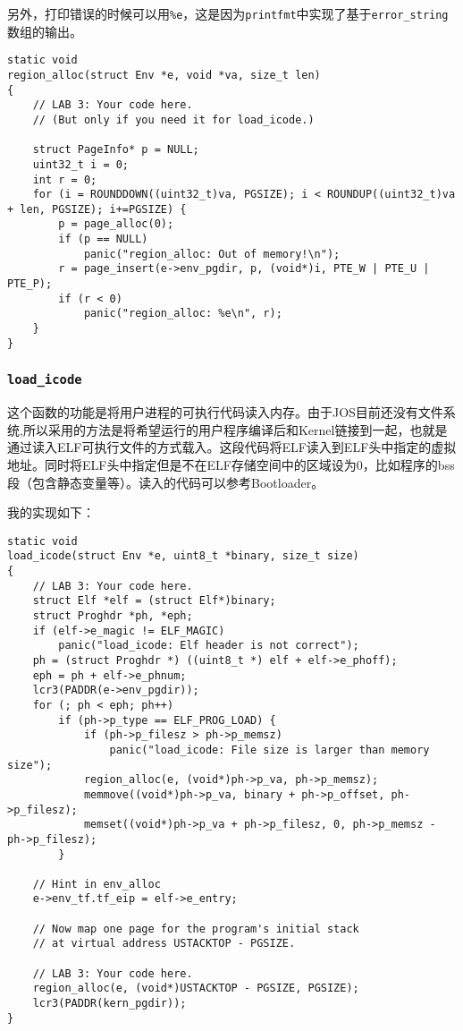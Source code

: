 \documentclass[11pt]{article}
\begin{document}
另外，打印错误的时候可以用\lstinline|%e|，这是因为\lstinline|printfmt|中实现了基于\lstinline|error_string|数组的输出。
\begin{lstlisting}[title=kern/env.c]
static void
region_alloc(struct Env *e, void *va, size_t len)
{
	// LAB 3: Your code here.
	// (But only if you need it for load_icode.)

	struct PageInfo* p = NULL;
	uint32_t i = 0;
	int r = 0;
	for (i = ROUNDDOWN((uint32_t)va, PGSIZE); i < ROUNDUP((uint32_t)va + len, PGSIZE); i+=PGSIZE) {
		p = page_alloc(0);
		if (p == NULL)
			panic("region_alloc: Out of memory!\n");
		r = page_insert(e->env_pgdir, p, (void*)i, PTE_W | PTE_U | PTE_P);
		if (r < 0)
			panic("region_alloc: %e\n", r);
	}
}
\end{lstlisting}

\subsubsection{\lstinline|load_icode|}

这个函数的功能是将用户进程的可执行代码读入内存。由于JOS目前还没有文件系统,所以采用的方法是将希望运行的用户程序编译后和Kernel链接到一起，也就是通过读入ELF可执行文件的方式载入。这段代码将ELF读入到ELF头中指定的虚拟地址。同时将ELF头中指定但是不在ELF存储空间中的区域设为0，比如程序的bss段（包含静态变量等）。读入的代码可以参考Bootloader。

我的实现如下：
\begin{lstlisting}[title=kern/env.c]
static void
load_icode(struct Env *e, uint8_t *binary, size_t size)
{
	// LAB 3: Your code here.
	struct Elf *elf = (struct Elf*)binary;
	struct Proghdr *ph, *eph;
	if (elf->e_magic != ELF_MAGIC)
		panic("load_icode: Elf header is not correct");
	ph = (struct Proghdr *) ((uint8_t *) elf + elf->e_phoff);
	eph = ph + elf->e_phnum;
	lcr3(PADDR(e->env_pgdir));
	for (; ph < eph; ph++)
		if (ph->p_type == ELF_PROG_LOAD) {
			if (ph->p_filesz > ph->p_memsz)
				panic("load_icode: File size is larger than memory size");
			region_alloc(e, (void*)ph->p_va, ph->p_memsz);
			memmove((void*)ph->p_va, binary + ph->p_offset, ph->p_filesz);
			memset((void*)ph->p_va + ph->p_filesz, 0, ph->p_memsz - ph->p_filesz);
		}

	// Hint in env_alloc
	e->env_tf.tf_eip = elf->e_entry;

	// Now map one page for the program's initial stack
	// at virtual address USTACKTOP - PGSIZE.

	// LAB 3: Your code here.
	region_alloc(e, (void*)USTACKTOP - PGSIZE, PGSIZE);
	lcr3(PADDR(kern_pgdir));
}
\end{lstlisting}
\end{document}
